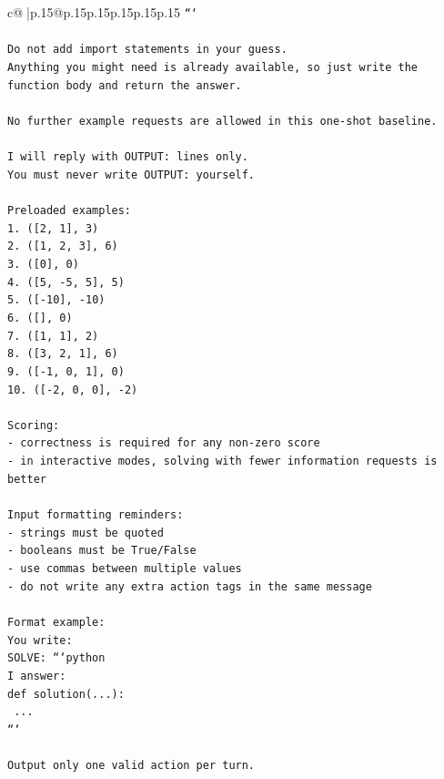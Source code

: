 \documentclass{article}
\begin{document}
{\begin{supertabular}{c@{$\;$}|p{.15\linewidth}@{}p{.15\linewidth}p{.15\linewidth}p{.15\linewidth}p{.15\linewidth}p{.15\linewidth}}
{{{\texttt{```} \\
\\ 
\texttt{Do not add import statements in your guess.} \\
\texttt{Anything you might need is already available, so just write the function body and return the answer.} \\
\\ 
\texttt{No further example requests are allowed in this one{-}shot baseline.} \\
\\ 
\texttt{I will reply with OUTPUT: lines only.} \\
\texttt{You must never write OUTPUT: yourself.} \\
\\ 
\texttt{Preloaded examples:} \\
\texttt{1. ({[}2, 1{]}, 3)} \\
\texttt{2. ({[}1, 2, 3{]}, 6)} \\
\texttt{3. ({[}0{]}, 0)} \\
\texttt{4. ({[}5, {-}5, 5{]}, 5)} \\
\texttt{5. ({[}{-}10{]}, {-}10)} \\
\texttt{6. ({[}{]}, 0)} \\
\texttt{7. ({[}1, 1{]}, 2)} \\
\texttt{8. ({[}3, 2, 1{]}, 6)} \\
\texttt{9. ({[}{-}1, 0, 1{]}, 0)} \\
\texttt{10. ({[}{-}2, 0, 0{]}, {-}2)} \\
\\ 
\texttt{Scoring:} \\
\texttt{{-} correctness is required for any non{-}zero score} \\
\texttt{{-} in interactive modes, solving with fewer information requests is better} \\
\\ 
\texttt{Input formatting reminders:} \\
\texttt{{-} strings must be quoted} \\
\texttt{{-} booleans must be True/False} \\
\texttt{{-} use commas between multiple values} \\
\texttt{{-} do not write any extra action tags in the same message} \\
\\ 
\texttt{Format example:} \\
\texttt{You write:} \\
\texttt{SOLVE: ```python} \\
\texttt{I answer:} \\
\texttt{def solution(...):} \\
\texttt{    ...} \\
\texttt{```} \\
\\ 
\texttt{Output only one valid action per turn.} \\
            }
        }
    }
     \\ \\


\end{supertabular}}
\end{document}
